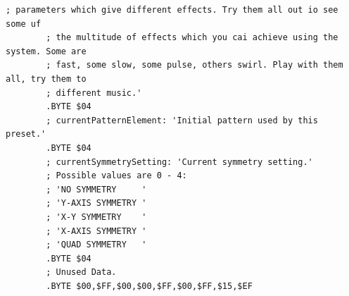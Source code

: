 \begin{lstlisting}[basicstyle=\ttfamily\tiny,caption=Source code for Preset 15.]
        ; parameters which give different effects. Try them all out io see some uf
        ; the multitude of effects which you cai achieve using the system. Some are
        ; fast, some slow, some pulse, others swirl. Play with them all, try them to
        ; different music.'
        .BYTE $04
        ; currentPatternElement: 'Initial pattern used by this preset.'
        .BYTE $04
        ; currentSymmetrySetting: 'Current symmetry setting.'
        ; Possible values are 0 - 4:
        ; 'NO SYMMETRY     '
        ; 'Y-AXIS SYMMETRY '
        ; 'X-Y SYMMETRY    '
        ; 'X-AXIS SYMMETRY '
        ; 'QUAD SYMMETRY   '
        .BYTE $04
        ; Unused Data.
        .BYTE $00,$FF,$00,$00,$FF,$00,$FF,$15,$EF
\end{lstlisting}

